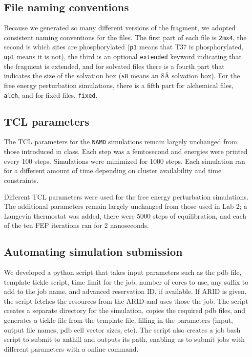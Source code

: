 \subsection{File naming conventions}
Because we generated so many different versions of the fragment, we adopted consistent naming conventions for the files.
The first part of each file is \texttt{2mx4},
the second is which sites are phosphorylated (\texttt{p1} means that T37 is phosphorylated, \texttt{up1} means it is not),
the third is an optional \texttt{extended} keyword indicating that the fragment is extended,
and for solvated files there is a fourth part that indicates the size of the solvation box (\texttt{s8} means an 8{\AA} solvation box).
For the free energy perturbation simulations, there is a fifth part for alchemical files, \texttt{alch}, and for fixed files, \texttt{fixed}.

\subsection{TCL parameters}
The TCL parameters for the \texttt{NAMD} simulations remain largely unchanged from those introduced in class.
Each step was a femtosecond and energies were printed every 100 steps.
Simulations were minimized for 1000 steps.
Each simulation ran for a different amount of time depending on cluster availability and time constraints.

Different TCL parameters were used for the free energy perturbation simulations.
The additional parameters remain largely unchanged from those used in Lab 2;
a Langevin thermostat was added, there were 5000 steps of equilibration, and each of the ten FEP iterations ran for 2 nanoseconds.


\subsection{Automating simulation submission} %
\label{sub:automating_simulation_submission}

We developed a python script that takes input parameters such as the pdb file, template tickle script, time limit for the job, number of cores to use, any suffix to add to the job name, and advanced reservation ID, if available.
If ARID is given, the script fetches the resources from the ARID and uses those the job.
The script creates a separate directory for the simulation, copies the required pdb files, and generates a tickle file from the template file, filling in the parameters (input, output file names, pdb cell vector sizes, etc).
The script also creates a job bash script to submit to anthill and outputs its path, enabling us to submit jobs with different parameters with a online command.

